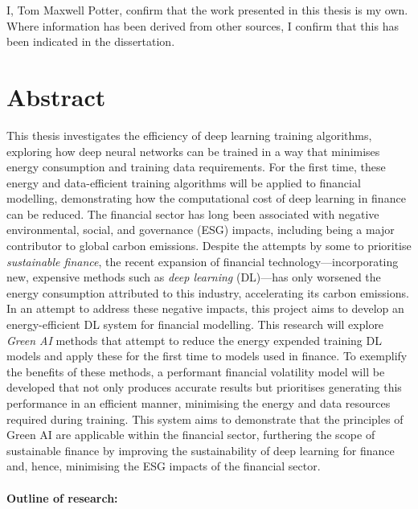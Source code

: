 \documentclass[a4paper, 11pt]{report}
\begin{document}
    I, Tom Maxwell Potter, confirm that the work presented in this thesis is my own. Where information has been derived from other sources, I confirm that this has been indicated in the dissertation.


    \newpage

    \chapter*{Abstract}

    This thesis investigates the efficiency of deep learning training algorithms, exploring how deep neural networks can be trained in a way that minimises energy consumption and training data requirements. For the first time, these energy and data-efficient training algorithms will be applied to financial modelling, demonstrating how the computational cost of deep learning in finance can be reduced. The financial sector has long been associated with negative environmental, social, and governance (ESG) impacts, including being a major contributor to global carbon emissions. Despite the attempts by some to prioritise \emph{sustainable finance}, the recent expansion of financial technology---incorporating new, expensive methods such as \emph{deep learning} (DL)---has only worsened the energy consumption attributed to this industry, accelerating its carbon emissions. In an attempt to address these negative impacts, this project aims to develop an energy-efficient DL system for financial modelling. This research will explore \emph{Green AI} methods that attempt to reduce the energy expended training DL models and apply these for the first time to models used in finance. To exemplify the benefits of these methods, a performant financial volatility model will be developed that not only produces accurate results but prioritises generating this performance in an efficient manner, minimising the energy and data resources required during training. This system aims to demonstrate that the principles of Green AI are applicable within the financial sector, furthering the scope of sustainable finance by improving the sustainability of deep learning for finance and, hence, minimising the ESG impacts of the financial sector.
    \\
    \textbf{\\Outline of research:} 
\end{document}
